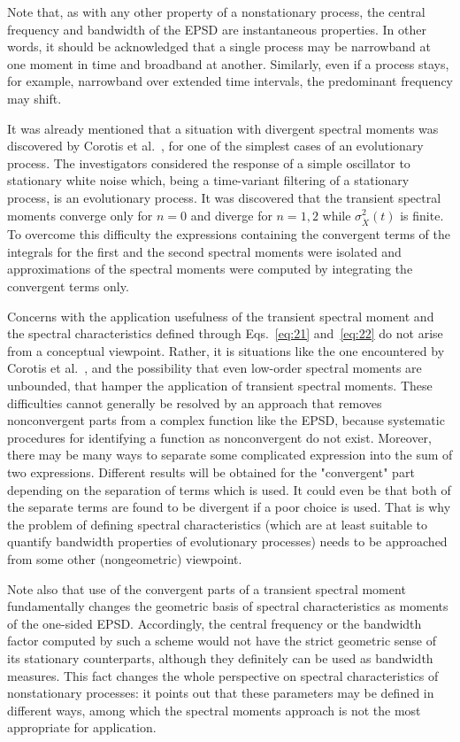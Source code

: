 \documentclass[12pt]{article}
\begin{document}
Note that, as with any other property of a nonstationary process, the central frequency and bandwidth of the EPSD are instantaneous properties. In other words, it should be acknowledged that a single process may be narrowband at one moment in time and broadband at another. Similarly, even if a process stays, for example, narrowband over extended time intervals, the predominant frequency may shift.

It was already mentioned that a situation with divergent spectral moments was discovered by Corotis et al.~\cite{Corotis1972}, for one of the simplest cases of an evolutionary process. The investigators considered the response of a simple oscillator to stationary white noise which, being a time-variant filtering of a stationary process, is an evolutionary process. It was discovered that the transient spectral moments converge only for $n=0$ and diverge for $n=1,2$ while $\sigma_{\dot{X}}^{2}(t)$ is finite. To overcome this difficulty the expressions containing the convergent terms of the integrals for the first and the second spectral moments were isolated and approximations of the spectral moments were computed by integrating the convergent terms only.

Concerns with the application usefulness of the transient spectral moment and the spectral characteristics defined through Eqs.~\eqref{eq:21} and~\eqref{eq:22} do not arise from a conceptual viewpoint. Rather, it is situations like the one encountered by Corotis et al.~\cite{Corotis1972}, and the possibility that even low-order spectral moments are unbounded, that hamper the application of transient spectral moments. These difficulties cannot generally be resolved by an approach that removes nonconvergent parts from a complex function like the EPSD, because systematic procedures for identifying a function as nonconvergent do not exist. Moreover, there may be many ways to separate some complicated expression into the sum of two expressions. Different results will be obtained for the "convergent" part depending on the separation of terms which is used. It could even be that both of the separate terms are found to be divergent if a poor choice is used. That is why the problem of defining spectral characteristics (which are at least suitable to quantify bandwidth properties of evolutionary processes) needs to be approached from some other (nongeometric) viewpoint.

Note also that use of the convergent parts of a transient spectral moment fundamentally changes the geometric basis of spectral characteristics as moments of the one-sided EPSD. Accordingly, the central frequency or the bandwidth factor computed by such a scheme would not have the strict geometric sense of its stationary counterparts, although they definitely can be used as bandwidth measures. This fact changes the whole perspective on spectral characteristics of nonstationary processes: it points out that these parameters may be defined in different ways, among which the spectral moments approach is not the most appropriate for application.
\end{document}
